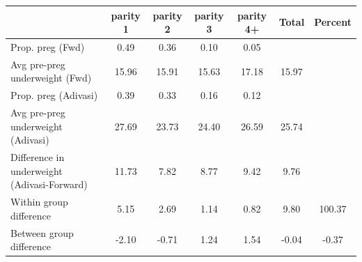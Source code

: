 \begin{tabular}{l*{6}{c}}
\toprule
            &\multicolumn{1}{c}{parity 1}&\multicolumn{1}{c}{parity 2}&\multicolumn{1}{c}{parity 3}&\multicolumn{1}{c}{parity 4+}&\multicolumn{1}{c}{Total}&\multicolumn{1}{c}{Percent}\\
\midrule
\midrule
Prop. preg (Fwd)&        0.49&        0.36&        0.10&        0.05&            &            \\
Avg pre-preg underweight (Fwd)&       15.96&       15.91&       15.63&       17.18&       15.97&            \\
Prop. preg (Adivasi)&        0.39&        0.33&        0.16&        0.12&            &            \\
Avg pre-preg underweight (Adivasi)&       27.69&       23.73&       24.40&       26.59&       25.74&            \\
Difference in underweight (Adivasi-Forward)&       11.73&        7.82&        8.77&        9.42&        9.76&            \\
Within group difference&        5.15&        2.69&        1.14&        0.82&        9.80&      100.37\\
Between group difference&       -2.10&       -0.71&        1.24&        1.54&       -0.04&       -0.37\\
\bottomrule
\end{tabular}
